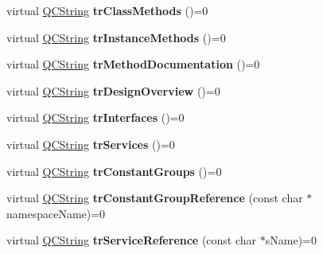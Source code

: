\begin{DoxyCompactItemize}
\item 
\hypertarget{class_translator_a823990922cf21ee0104c21abc559f6bb}{virtual \hyperlink{class_q_c_string}{Q\-C\-String} {\bfseries tr\-Class\-Methods} ()=0}\label{class_translator_a823990922cf21ee0104c21abc559f6bb}

\item 
\hypertarget{class_translator_a7282f8622b53938de18449faedea9407}{virtual \hyperlink{class_q_c_string}{Q\-C\-String} {\bfseries tr\-Instance\-Methods} ()=0}\label{class_translator_a7282f8622b53938de18449faedea9407}

\item 
\hypertarget{class_translator_ad414368ab95ad57341b5c5e6365a806a}{virtual \hyperlink{class_q_c_string}{Q\-C\-String} {\bfseries tr\-Method\-Documentation} ()=0}\label{class_translator_ad414368ab95ad57341b5c5e6365a806a}

\item 
\hypertarget{class_translator_a20b15a11dc4f185d8f09e392f450dd6c}{virtual \hyperlink{class_q_c_string}{Q\-C\-String} {\bfseries tr\-Design\-Overview} ()=0}\label{class_translator_a20b15a11dc4f185d8f09e392f450dd6c}

\item 
\hypertarget{class_translator_af7afc5c589387980db68bf848263f4cc}{virtual \hyperlink{class_q_c_string}{Q\-C\-String} {\bfseries tr\-Interfaces} ()=0}\label{class_translator_af7afc5c589387980db68bf848263f4cc}

\item 
\hypertarget{class_translator_a387977e4d700b967482fd19e9c507077}{virtual \hyperlink{class_q_c_string}{Q\-C\-String} {\bfseries tr\-Services} ()=0}\label{class_translator_a387977e4d700b967482fd19e9c507077}

\item 
\hypertarget{class_translator_adad9f3b5df4909f0512fbdb427753db3}{virtual \hyperlink{class_q_c_string}{Q\-C\-String} {\bfseries tr\-Constant\-Groups} ()=0}\label{class_translator_adad9f3b5df4909f0512fbdb427753db3}

\item 
\hypertarget{class_translator_a996b9b31370e906b03b56ad1078846a8}{virtual \hyperlink{class_q_c_string}{Q\-C\-String} {\bfseries tr\-Constant\-Group\-Reference} (const char $\ast$namespace\-Name)=0}\label{class_translator_a996b9b31370e906b03b56ad1078846a8}

\item 
\hypertarget{class_translator_a088cf46f39dc6702392c7ec04171ad10}{virtual \hyperlink{class_q_c_string}{Q\-C\-String} {\bfseries tr\-Service\-Reference} (const char $\ast$s\-Name)=0}\label{class_translator_a088cf46f39dc6702392c7ec04171ad10}


\end{DoxyCompactItemize}
